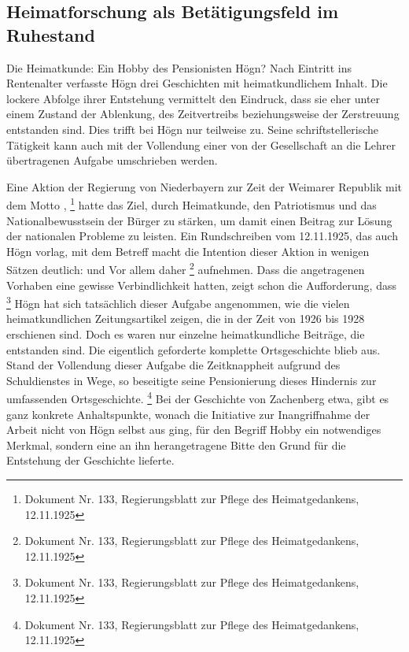 \subsection{Heimatforschung als Betätigungsfeld im Ruhestand}

\hypertarget{RefHeadingToc100333736}{}Die Heimatkunde: Ein Hobby des
Pensionisten Högn? Nach Eintritt ins Rentenalter verfasste Högn drei
Geschichten mit heimatkundlichem Inhalt. Die lockere Abfolge ihrer
Entstehung vermittelt den Eindruck, dass sie eher unter einem Zustand
der Ablenkung, des Zeitvertreibs beziehungsweise der Zerstreuung
entstanden sind. Dies trifft bei Högn nur teilweise zu. Seine
schriftstellerische Tätigkeit kann auch mit der Vollendung einer von
der Gesellschaft an die Lehrer übertragenen Aufgabe umschrieben werden.

Eine Aktion der Regierung von Niederbayern zur Zeit der Weimarer
Republik mit dem Motto , \footnote{Dokument Nr. 133, Regierungsblatt zur
Pflege des Heimatgedankens, 12.11.1925} hatte das Ziel, durch
Heimatkunde, den Patriotismus und das Nationalbewusstsein der Bürger zu
stärken, um damit einen Beitrag zur Lösung der nationalen Probleme zu
leisten. Ein Rundschreiben vom 12.11.1925, das auch Högn vorlag, mit
dem Betreff 
macht die Intention dieser Aktion in wenigen Sätzen deutlich:
 und
 Vor allem daher \footnote{Dokument Nr. 133, Regierungsblatt zur
Pflege des Heimatgedankens, 12.11.1925} aufnehmen. Dass die
angetragenen Vorhaben eine gewisse Verbindlichkeit hatten, zeigt schon
die Aufforderung, dass \footnote{
Dokument Nr. 133, Regierungsblatt zur Pflege des Heimatgedankens,
12.11.1925} Högn hat sich tatsächlich dieser Aufgabe angenommen, wie
die vielen heimatkundlichen Zeitungsartikel zeigen, die in der Zeit von
1926 bis 1928 erschienen sind. Doch es waren nur einzelne
heimatkundliche Beiträge, die entstanden sind. Die eigentlich
geforderte komplette Ortsgeschichte blieb aus. Stand der Vollendung
dieser Aufgabe die Zeitknappheit aufgrund des Schuldienstes in Wege, so
beseitigte seine Pensionierung dieses Hindernis zur umfassenden
Ortsgeschichte. \footnote{Dokument Nr. 133, Regierungsblatt zur Pflege
des Heimatgedankens, 12.11.1925} Bei der Geschichte von Zachenberg
etwa, gibt es ganz konkrete Anhaltspunkte, wonach die Initiative zur
Inangriffnahme der Arbeit nicht von Högn selbst aus ging, für den
Begriff Hobby ein notwendiges Merkmal, sondern eine an ihn
herangetragene Bitte den Grund für die Entstehung der Geschichte
lieferte.

